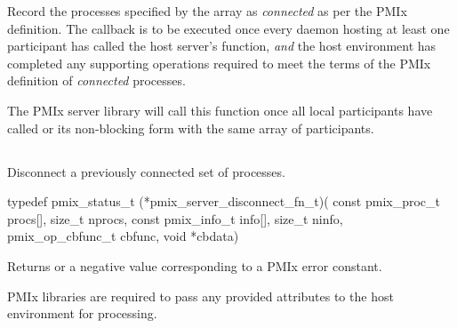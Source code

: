 Record the processes specified by the  array as \textit{connected} as per the \ac{PMIx} definition. The callback is to be executed once every daemon hosting at least one participant has called the host server's  function, \textit{and} the host environment has completed any supporting operations required to meet the terms of the \ac{PMIx} definition of \textit{connected} processes.

\advicermstart
The \ac{PMIx} server library will
call this function once all local participants have called  or its non-blocking form with the same array of participants.
\advicermend

\subsection{}

\summary

Disconnect a previously connected set of processes.

\format

\cspecificstart
\begin{codepar}
typedef pmix_status_t (*pmix_server_disconnect_fn_t)(
                             const pmix_proc_t procs[],
                             size_t nprocs,
                             const pmix_info_t info[],
                             size_t ninfo,
                             pmix_op_cbfunc_t cbfunc,
                             void *cbdata)
\end{codepar}
\cspecificend

\begin{arglist}
\end{arglist}

Returns  or a negative value corresponding to a \ac{PMIx} error constant.

\reqattrstart
\ac{PMIx} libraries are required to pass any provided attributes to the host environment for processing.
\reqattrend


